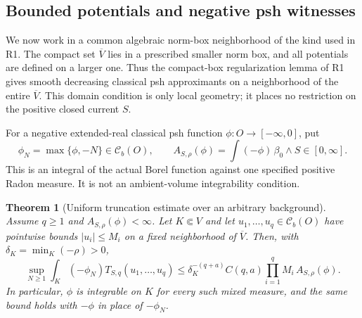 \documentclass[11pt,a4paper]{article}
\numberwithin{equation}{section}
\newtheorem{theorem}{Theorem}[section]
\theoremstyle{definition}
\theoremstyle{remark}
\newcommand{\Cb}{\mathcal C_b}
\begin{document}
\subsection{Bounded potentials and negative psh witnesses}

We now work in a common algebraic norm-box neighborhood of the kind
used in R1. The compact set $\overline V$ lies in a prescribed
smaller norm box, and all potentials are defined on a larger one.
Thus the compact-box regularization lemma of R1 gives smooth
decreasing classical psh approximants on a neighborhood of the
entire $\overline V$. This domain condition is only local geometry;
it places no restriction on the positive closed current $S$.

For a negative extended-real classical psh function
$\phi:O\to[-\infty,0]$, put
\[
 \phi_N=\max\{\phi,-N\}\in\Cb(O),
 \qquad
 A_{S,\rho}(\phi)=\int(-\phi)\,\beta_0\wedge S\in[0,\infty].
\]
This is an integral of the actual Borel function against one
specified positive Radon measure. It is not an ambient-volume
integrability condition.

\begin{theorem}[Uniform truncation estimate over an arbitrary background]
\label{thm:r2-weighted-l1}
Assume $q\geq1$ and $A_{S,\rho}(\phi)<\infty$.
Let $K\Subset V$ and let $u_1,\ldots,u_q\in\Cb(O)$ have
pointwise bounds $|u_i|\leq M_i$ on a fixed neighborhood of
$\overline V$. Then, with
$\delta_K=\min_K(-\rho)>0$,
\begin{equation}
\label{eq:r2-uniform-truncation}
 \sup_{N\geq1}\int_K(-\phi_N)
       T_{S,q}(u_1,\ldots,u_q)
 \leq \delta_K^{-(q+a)} C(q,a)
             \prod_{i=1}^qM_i\,A_{S,\rho}(\phi).
\end{equation}
In particular, $\phi$ is integrable on $K$ for every such mixed
measure, and the same bound holds with $-\phi$ in place of
$-\phi_N$.
\end{theorem}
\end{document}
